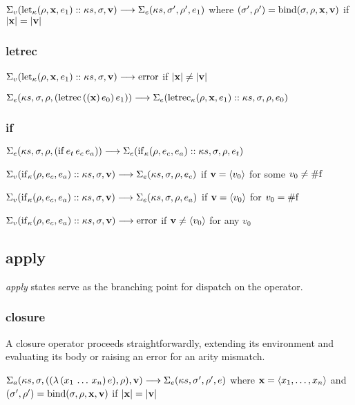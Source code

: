 \documentclass{sigplanconf}
\begin{document}
$\Sigma_v(\mathrm{let}_\kappa(\rho,\mathbf{x},e_1)::\kappa s,\sigma,\mathbf{v})\longrightarrow \Sigma_e(\kappa s,\sigma',\rho',e_1)$ where $(\sigma',\rho')=\mathrm{bind}(\sigma,\rho,\mathbf{x},\mathbf{v})$ if $|\mathbf{x}|=|\mathbf{v}|$

\subsubsection{letrec}

$\Sigma_v(\mathrm{let}_\kappa(\rho,\mathbf{x},e_1)::\kappa s,\sigma,\mathbf{v})\longrightarrow \mathrm{error}$ if $|\mathbf{x}|\ne|\mathbf{v}|$

$\Sigma_e(\kappa s,\sigma,\rho,(\mathrm{letrec}\,((\mathbf{x})\,e_0)\,e_1))\longrightarrow \Sigma_e(\mathrm{letrec}_\kappa(\rho,\mathbf{x},e_1)::\kappa s,\sigma,\rho,e_0)$

\subsubsection{if}

$\Sigma_e(\kappa s,\sigma,\rho,(\mathrm{if}\,e_t\,e_c\,e_a))\longrightarrow \Sigma_e(\mathrm{if}_\kappa(\rho,e_c,e_a)::\kappa s,\sigma,\rho,e_t)$

$\Sigma_v(\mathrm{if}_\kappa(\rho,e_c,e_a)::\kappa s,\sigma,\mathbf{v})\longrightarrow \Sigma_e(\kappa s,\sigma,\rho,e_c)$
if $\mathbf{v}=\langle v_0\rangle$ for some $v_0\ne\mathrm{\#f}$

$\Sigma_v(\mathrm{if}_\kappa(\rho,e_c,e_a)::\kappa s,\sigma,\mathbf{v})\longrightarrow \Sigma_e(\kappa s,\sigma,\rho,e_a)$
if $\mathbf{v}=\langle v_0\rangle$ for $v_0=\mathrm{\#f}$

$\Sigma_v(\mathrm{if}_\kappa(\rho,e_c,e_a)::\kappa s,\sigma,\mathbf{v})\longrightarrow \mathrm{error}$
if $\mathbf{v}\ne\langle v_0\rangle$ for any $v_0$


\subsection{apply}

\emph{apply} states serve as the branching point for dispatch on the operator.

\subsubsection{closure}

A closure operator proceeds straightforwardly, extending its environment and evaluating its body or raising an error for an arity mismatch.

$\Sigma_a(\kappa s,\sigma,((\lambda\,(x_1\,\dots\,x_n)\,e),\rho),\mathbf{v})\longrightarrow \Sigma_e(\kappa s,\sigma',\rho',e)$
where $\mathbf{x}=\langle x_1,\dots,x_n\rangle$ and $(\sigma',\rho')=\mathrm{bind}(\sigma,\rho,\mathbf{x},\mathbf{v})$ if $|\mathbf{x}|=|\mathbf{v}|$
\end{document}
